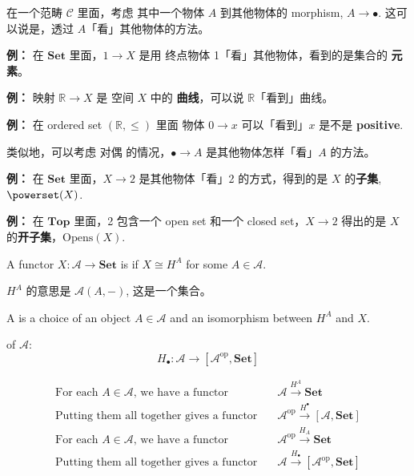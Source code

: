 在一个范畴 $\mathcal{C}$ 里面，考虑 其中一个物体 $A$ 到其他物体的 morphism, $A \rightarrow \bullet$.  这可以说是，透过 $A$「看」其他物体的方法。

\textbf{例：} 在 $\mathbf{Set}$ 里面，$1 \rightarrow X$ 是用 终点物体 1「看」其他物体，看到的是集合的 \textbf{元素}。

\textbf{例：} 映射 $\mathbb{R} \rightarrow X$ 是 空间 $X$ 中的 \textbf{曲线}，可以说 $\mathbb{R}$「看到」曲线。

\textbf{例：} 在 ordered set $(\mathbb{R}, \le)$ 里面 物体 $0 \rightarrow x$ 可以「看到」$x$ 是不是 \textbf{positive}.

类似地，可以考虑 对偶 的情况，$\bullet \rightarrow A$ 是其他物体怎样「看」$A$ 的方法。

\textbf{例：} 在 $\mathbf{Set}$ 里面，$X \rightarrow 2$ 是其他物体「看」2 的方式，得到的是 $X$ 的\textbf{子集}, $\powerset(X)$. 

\textbf{例：} 在 $\mathbf{Top}$ 里面，2 包含一个 open set 和一个 closed set，$X \rightarrow 2$ 得出的是 $X$ 的\textbf{开子集}，$\mathrm{Opens}(X)$.

A functor $X: \mathcal{A} \rightarrow \mathbf{Set}$ is  if $X \cong H^A$ for some $A \in \mathcal{A}$.

$H^A$ 的意思是 $\mathcal{A}(A, -)$, 这是一个集合。 

A  is a choice of an object $A \in \mathcal{A}$ and an isomorphism between $H^A$ and $X$. 

 of $\mathcal{A}$:
\begin{equation}
H_{\bullet}: \mathcal{A} \rightarrow [\mathcal{A}^{\mathrm{op}} , \mathbf{Set}]
\end{equation}

\begin{align}
\mbox{For each } A \in \mathcal{A} \mbox{, we have a functor} \quad
& \mathcal{A} \stackrel{H^A}{\longrightarrow} \mathbf{Set} \nonumber \\
\mbox{Putting them all together gives a functor} \quad
& \mathcal{A}^{\mathrm{op}} \stackrel{H^{\bullet}}{\longrightarrow} [\mathcal{A} , \mathbf{Set}] \\[10pt]
\mbox{For each } A \in \mathcal{A} \mbox{, we have a functor} \quad
& \mathcal{A}^{\mathrm{op}} \stackrel{H_A}{\longrightarrow} \mathbf{Set} \nonumber \\
\mbox{Putting them all together gives a functor} \quad
& \mathcal{A} \stackrel{H_{\bullet}}{\longrightarrow} [\mathcal{A}^{\mathrm{op}} , \mathbf{Set}] \nonumber
\end{align}

